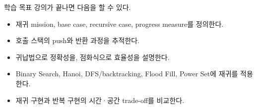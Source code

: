 \begin{frame}[plain]\vfill{\color{AlgoBlue}\inserttitle\par}\vspace{3mm}{\color{AlgoOrange}\rule{3cm}{1.2pt}}\par\vspace{3mm}{\color{AlgoGray}\insertsubtitle}\vfill
\end{frame}
\begin{frame}{학습 목표}
강의가 끝나면 다음을 할 수 있다.
\begin{itemize}
  \item 재귀 mission, base case, recursive case, progress measure를 정의한다.
  \item 호출 스택의 push와 반환 과정을 추적한다.
  \item 귀납법으로 정확성을, 점화식으로 효율성을 설명한다.
  \item Binary Search, Hanoi, DFS/backtracking, Flood Fill, Power Set에 재귀를 적용한다.
  \item 재귀 구현과 반복 구현의 시간·공간 trade-off를 비교한다.
\end{itemize}
\end{frame}
